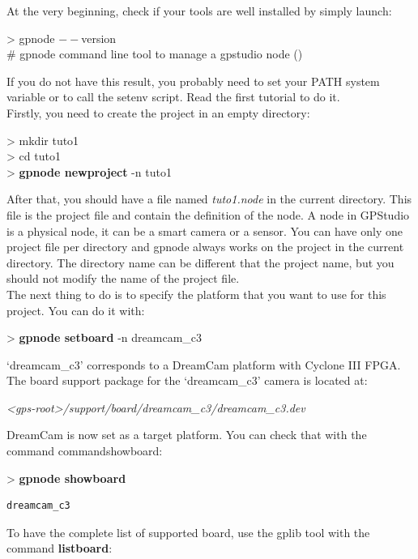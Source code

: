 \documentclass[10pt,a4paper]{article}
\begin{document}
At the very beginning, check if your tools are well installed by simply launch:
\begin{sample}
> gpnode $--$version \\
\# gpnode command line tool to manage a gpstudio node (\version)
\end{sample}

If you do not have this result, you probably need to set your PATH system variable or to call the setenv script. Read the first tutorial to do it.\\

Firstly, you need to create the project in an empty directory:
\begin{sample}
> mkdir tuto1\\
> cd tuto1\\
> \textbf{gpnode newproject} -n tuto1
\end{sample}

After that, you should have a file named \emph{tuto1.node} in the current directory. This file is the project file and contain the definition of the node. A node in GPStudio is a physical node, it can be a smart camera or a sensor. You can have only one project file per directory and gpnode always works on the project in the current directory. The directory name can be different that the project name, but you should not modify the name of the project file.\\

The next thing to do is to specify the platform that you want to use for this project. You can do it with:

\begin{sample}
> \textbf{gpnode setboard} -n dreamcam\_c3
\end{sample}

`dreamcam\_c3' corresponds to a DreamCam platform with Cyclone III FPGA. The board support package for the `dreamcam\_c3' camera is located at:

\emph{<gps-root>/support/board/dreamcam\_c3/dreamcam\_c3.dev}

DreamCam is now set as a target platform. You can check that with the command command{showboard}:

\begin{sample}
> \textbf{gpnode showboard}
\begin{Verbatim}
dreamcam_c3
\end{Verbatim}
\end{sample}

To have the complete list of supported board, use the gplib tool with the command \textbf{listboard}:
\end{document}
